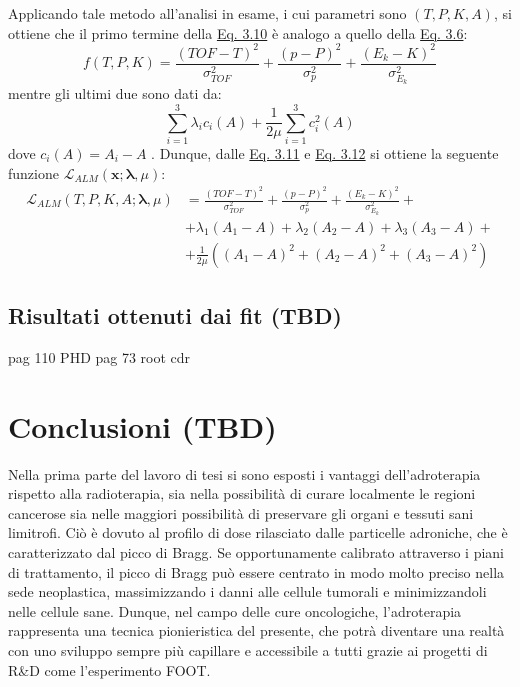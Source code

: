 \documentclass[12pt,a4paper,twoside]{report}
\newcommand{\vect}[1]{\boldsymbol{#1}}
\begin{document}
	Applicando tale metodo all'analisi in esame, i cui parametri sono $\left(T,P,K,A\right)$, si ottiene che il primo termine della \hyperref[eq:augmented_lagrangian_funct]{Eq. 3.10} è analogo a quello della \hyperref[eq:chi_square]{Eq. 3.6}:
	\begin{equation}
		f\left(T,P,K\right)=\frac{\left(TOF-T\right)^2}{\sigma^2_{TOF}}+\frac{\left(p-P\right)^2}{\sigma^2_{p}}+\frac{\left(E_k-K\right)^2}{\sigma^2_{E_k}}
		\label{eq:first_term_ALM}
	\end{equation}
	mentre gli ultimi due sono dati da:
	\begin{equation}
		\sum_{i=1}^{3}\lambda_ic_i\left(A\right)+\frac{1}{2\mu}\sum_{i=1}^{3}c_i^2\left(A\right)
		\label{eq:other_terms_ALM}
	\end{equation}
	dove $c_i\left(A\right)=A_i-A$ \cite{valle2019design}. Dunque, dalle \hyperref[eq:first_term_ALM]{Eq. 3.11} e \hyperref[eq:other_terms_ALM]{Eq. 3.12} si ottiene la seguente funzione $\mathcal{L}_{ALM}\left(\vect{x};\vect{\lambda},\mu\right)$:
	\begin{equation}
		\begin{aligned}
			\mathcal{L}_{ALM}\left(T,P,K,A;\vect{\lambda},\mu\right)&=\frac{\left(TOF-T\right)^2}{\sigma^2_{TOF}}+\frac{\left(p-P\right)^2}{\sigma^2_{p}}+\frac{\left(E_k-K\right)^2}{\sigma^2_{E_k}}+\\
			&+\lambda_1\left(A_1-A\right)+\lambda_2\left(A_2-A\right)+\lambda_3\left(A_3-A\right)+\\
			&+\frac{1}{2\mu}\left(\left(A_1-A\right)^2+\left(A_2-A\right)^2+\left(A_3-A\right)^2\right)
		\end{aligned}
		\label{eq:alm_analysis}
	\end{equation}
	
	\section{Risultati ottenuti dai fit (TBD)}
	pag 110 PHD
	pag 73 root cdr
					
	\chapter*{Conclusioni (TBD)}
	Nella prima parte del lavoro di tesi si sono esposti i vantaggi dell'adroterapia rispetto alla radioterapia, sia nella possibilità di curare localmente le regioni cancerose sia nelle maggiori possibilità di preservare gli organi e tessuti sani limitrofi. Ciò è dovuto al profilo di dose rilasciato dalle particelle adroniche, che è caratterizzato dal picco di Bragg. Se opportunamente calibrato attraverso i piani di trattamento, il picco di Bragg può essere centrato in modo molto preciso nella sede neoplastica, massimizzando i danni alle cellule tumorali e minimizzandoli nelle cellule sane. Dunque, nel campo delle cure oncologiche, l'adroterapia rappresenta una tecnica pionieristica del presente, che potrà diventare una realtà con uno sviluppo sempre più capillare e accessibile a tutti grazie ai progetti di R\&D come l'esperimento FOOT.
		
\end{document}

